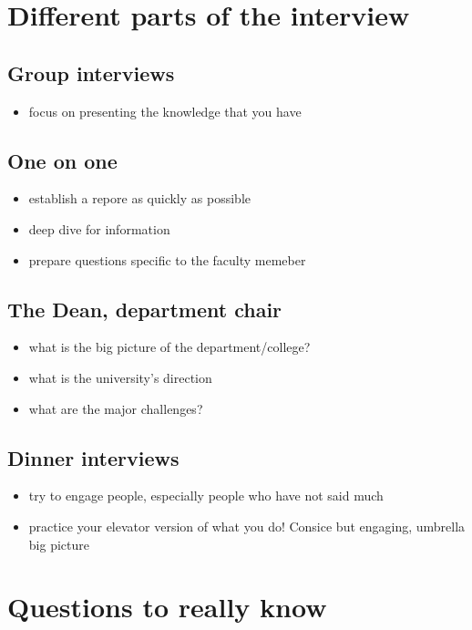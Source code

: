 \documentclass[12pt]{article}
\begin{document}
\section{Different parts of the interview}
\subsection{Group interviews}
\begin{itemize}
\item focus on presenting the knowledge that you have
\end{itemize}

\subsection{One on one}
\begin{itemize}
\item establish a repore as quickly as possible
\item deep dive for information
\item prepare questions specific to the faculty memeber
\end{itemize}

\subsection{The Dean, department chair}
\begin{itemize}
\item what is the big picture of the department/college?
\item what is the university's direction
\item what are the major challenges?
\end{itemize}

\subsection{Dinner interviews}
\begin{itemize}
\item try to engage people, especially people who have not said much
\item practice your elevator version of what you do! Consice but
  engaging, umbrella big picture
\end{itemize}

\section{Questions to really know}
\end{document}
